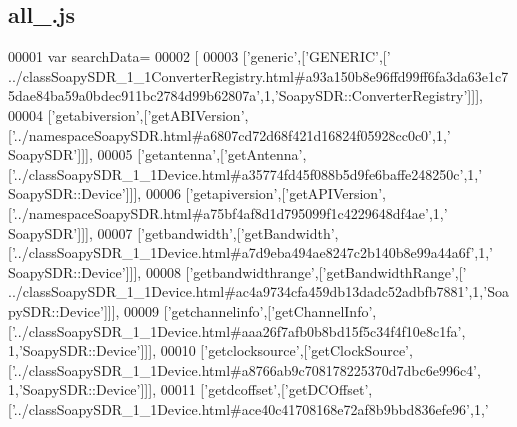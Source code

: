\subsection{all\+\_.\+js}
\label{all__6_8js_source}

\begin{DoxyCode}
00001 var searchData=
00002 [
00003   [\textcolor{stringliteral}{'generic'},[\textcolor{stringliteral}{'GENERIC'},[\textcolor{stringliteral}{'
      ../classSoapySDR\_1\_1ConverterRegistry.html#a93a150b8e96ffd99ff6fa3da63e1c75dae84ba59a0bdec911bc2784d99b62807a'},1,\textcolor{stringliteral}{'SoapySDR::ConverterRegistry'}]]],
00004   [\textcolor{stringliteral}{'getabiversion'},[\textcolor{stringliteral}{'getABIVersion'},[\textcolor{stringliteral}{'../namespaceSoapySDR.html#a6807cd72d68f421d16824f05928cc0c0'},1,\textcolor{stringliteral}{'
      SoapySDR'}]]],
00005   [\textcolor{stringliteral}{'getantenna'},[\textcolor{stringliteral}{'getAntenna'},[\textcolor{stringliteral}{'../classSoapySDR\_1\_1Device.html#a35774fd45f088b5d9fe6baffe248250c'},1,\textcolor{stringliteral}{'
      SoapySDR::Device'}]]],
00006   [\textcolor{stringliteral}{'getapiversion'},[\textcolor{stringliteral}{'getAPIVersion'},[\textcolor{stringliteral}{'../namespaceSoapySDR.html#a75bf4af8d1d795099f1c4229648df4ae'},1,\textcolor{stringliteral}{'
      SoapySDR'}]]],
00007   [\textcolor{stringliteral}{'getbandwidth'},[\textcolor{stringliteral}{'getBandwidth'},[\textcolor{stringliteral}{'../classSoapySDR\_1\_1Device.html#a7d9eba494ae8247c2b140b8e99a44a6f'},1,\textcolor{stringliteral}{'
      SoapySDR::Device'}]]],
00008   [\textcolor{stringliteral}{'getbandwidthrange'},[\textcolor{stringliteral}{'getBandwidthRange'},[\textcolor{stringliteral}{'
      ../classSoapySDR\_1\_1Device.html#ac4a9734cfa459db13dadc52adbfb7881'},1,\textcolor{stringliteral}{'SoapySDR::Device'}]]],
00009   [\textcolor{stringliteral}{'getchannelinfo'},[\textcolor{stringliteral}{'getChannelInfo'},[\textcolor{stringliteral}{'../classSoapySDR\_1\_1Device.html#aaa26f7afb0b8bd15f5c34f4f10e8c1fa'},
      1,\textcolor{stringliteral}{'SoapySDR::Device'}]]],
00010   [\textcolor{stringliteral}{'getclocksource'},[\textcolor{stringliteral}{'getClockSource'},[\textcolor{stringliteral}{'../classSoapySDR\_1\_1Device.html#a8766ab9c708178225370d7dbc6e996c4'},
      1,\textcolor{stringliteral}{'SoapySDR::Device'}]]],
00011   [\textcolor{stringliteral}{'getdcoffset'},[\textcolor{stringliteral}{'getDCOffset'},[\textcolor{stringliteral}{'../classSoapySDR\_1\_1Device.html#ace40c41708168e72af8b9bbd836efe96'},1,\textcolor{stringliteral}{'
}
\end{DoxyCode}
